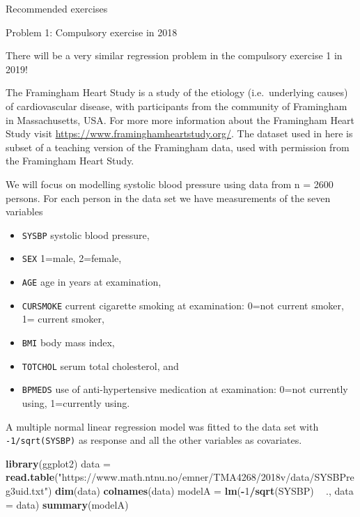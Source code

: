 \documentclass[ignorenonframetext,]{beamer}
\newenvironment{Shaded}{\begin{snugshade}}{\end{snugshade}}
\newcommand{\KeywordTok}[1]{\textcolor[rgb]{0.13,0.29,0.53}{\textbf{#1}}}
\newcommand{\DataTypeTok}[1]{\textcolor[rgb]{0.13,0.29,0.53}{#1}}
\newcommand{\DecValTok}[1]{\textcolor[rgb]{0.00,0.00,0.81}{#1}}
\newcommand{\StringTok}[1]{\textcolor[rgb]{0.31,0.60,0.02}{#1}}
\newcommand{\OperatorTok}[1]{\textcolor[rgb]{0.81,0.36,0.00}{\textbf{#1}}}
\newcommand{\NormalTok}[1]{#1}
\providecommand{\tightlist}{%
  \setlength{\itemsep}{0pt}\setlength{\parskip}{0pt}}
\begin{document}
\begin{frame}[fragile]{Recommended exercises}

\begin{block}{Problem 1: Compulsory exercise in 2018}

There will be a very similar regression problem in the compulsory
exercise 1 in 2019!

The Framingham Heart Study is a study of the etiology (i.e.~underlying
causes) of cardiovascular disease, with participants from the community
of Framingham in Massachusetts, USA. For more more information about the
Framingham Heart Study visit
\url{https://www.framinghamheartstudy.org/}. The dataset used in here is
subset of a teaching version of the Framingham data, used with
permission from the Framingham Heart Study.

We will focus on modelling systolic blood pressure using data from n =
2600 persons. For each person in the data set we have measurements of
the seven variables

\begin{itemize}
\tightlist
\item
  \texttt{SYSBP} systolic blood pressure,
\item
  \texttt{SEX} 1=male, 2=female,
\item
  \texttt{AGE} age in years at examination,
\item
  \texttt{CURSMOKE} current cigarette smoking at examination: 0=not
  current smoker, 1= current smoker,
\item
  \texttt{BMI} body mass index,
\item
  \texttt{TOTCHOL} serum total cholesterol, and
\item
  \texttt{BPMEDS} use of anti-hypertensive medication at examination:
  0=not currently using, 1=currently using.
\end{itemize}

A multiple normal linear regression model was fitted to the data set
with \texttt{-1/sqrt(SYSBP)} as response and all the other variables as
covariates.

\begin{Shaded}
\begin{Highlighting}[]
\KeywordTok{library}\NormalTok{(ggplot2)}
\NormalTok{data =}\StringTok{ }\KeywordTok{read.table}\NormalTok{(}\StringTok{"https://www.math.ntnu.no/emner/TMA4268/2018v/data/SYSBPreg3uid.txt"}\NormalTok{)}
\KeywordTok{dim}\NormalTok{(data)}
\KeywordTok{colnames}\NormalTok{(data)}
\NormalTok{modelA =}\StringTok{ }\KeywordTok{lm}\NormalTok{(}\OperatorTok{-}\DecValTok{1}\OperatorTok{/}\KeywordTok{sqrt}\NormalTok{(SYSBP) }\OperatorTok{~}\StringTok{ }\NormalTok{., }\DataTypeTok{data =}\NormalTok{ data)}
\KeywordTok{summary}\NormalTok{(modelA)}
\end{Highlighting}
\end{Shaded}


\end{block}
\end{frame}
\end{document}

